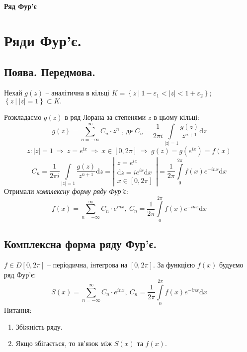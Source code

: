 \documentclass[a4paper]{scrartcl}
\theoremstyle{definition}
\theoremstyle{remark}
\theoremstyle{definition}
\theoremstyle{definition}
\def\i{\infty}                 %
\def\bdash{\ \Big|\  }         %
\begin{document}
\tableofcontents
\newpage

\begin{center}
	\Huge \textbf{Ряд Фур'є}
\end{center}
\par
\section{Ряди Фур'є.}
\subsection{Поява. Передмова.}
Нехай $g(z)$ -- аналітична в  кільці $K = \left\lbrace  z \bdash 1 - \varepsilon_1 < |z| < 1 + \varepsilon_2 \right\rbrace$; $ \left\lbrace  z \bdash  |z| = 1 \right\rbrace \subset K.$\par
Розкладаємо $g(z)$ в ряд Лорана за степенями $z $ в цьому кільці:
$$
g(z) =  \sum\limits_{n =  - \i}^{ \infty}{ C_n \cdot z^n} \text{ , де } C_n = \frac{1}{2\pi i}  \int\limits_{|z| = 1 }^{ }{ \frac{ g(z)}{z^{n+1} }  \mathrm{d} z}
$$
$$
z : |z| =1 \ \Longrightarrow \  z = e^{ix} \ \Longrightarrow \  x \in  [0, 2 \pi]
 \ \Longrightarrow \
g(z) = g(e^{ix}) = f(x)
$$
$$
C_n = \frac{1}{2\pi i}  \int\limits_{|z| = 1 }^{ }{ \frac{ g(z)}{z^{n+1} }  \mathrm{d} z} = \left|  \begin{gathered}
  z = e^{ix}\\
  \mathrm{d} z = ie^{ix} \mathrm{d} x \\
  x \in [0, 2\pi]
\end{gathered} \right| = \frac{1}{2\pi}  \int\limits_{0}^{ 2 \pi}{ f(x) e^{-inx} \mathrm{d} x}
$$
Отримали \textit{комплексну форму ряду Фур'є}:
$$
f(x) =  \sum\limits_{n =-\i }^{ \infty}{C_n \cdot e^{inx}}, \  C_n =  \frac{1}{2\pi}  \int\limits_{0}^{ 2 \pi}{ f(x) e^{-inx} \mathrm{d} x}
$$
\subsection{Комплексна форма ряду Фур'є.}
$f \in D[0, 2\pi]$ -- періодична, інтегрова на $[0, 2 \pi]$. За функцією $f(x)$ будуємо ряд Фур'є:
$$
S(x) =  \sum\limits_{n =-\i }^{ \infty}{C_n \cdot e^{inx}}, \  C_n =  \frac{1}{2\pi}  \int\limits_{0}^{ 2 \pi}{ f(x) e^{-inx} \mathrm{d} x}
$$
Питання:
\begin{enumerate}
  \item  Збіжність ряду.
\item  Якщо збігається, то зв'язок між $S(x)$ та $f(x)$.
\end{enumerate}
\end{document}
